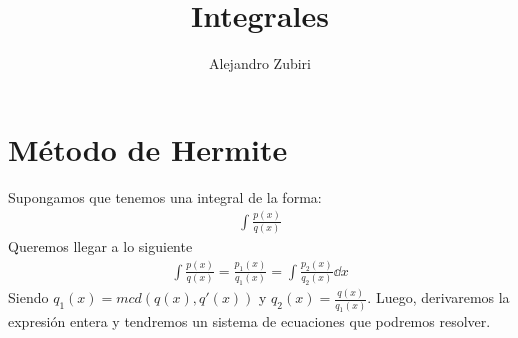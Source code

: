 \documentclass{article}
\author{Alejandro Zubiri}
\title{Integrales}
\begin{document}
\maketitle
\tableofcontents
\pagebreak
\section{Método de Hermite}
Supongamos que tenemos una integral de la forma:
\begin{equation}
	\begin{split}
		\int \frac{p(x)}{q(x)}
	\end{split}
\end{equation}
Queremos llegar a lo siguiente
\begin{equation}
	\begin{split}
		\int \frac{p(x)}{q(x)} = \frac{p_{1}(x)}{q_{1}(x)}=
		\int \frac{p_{2}(x)}{q_{2}(x)} \dd{x}
	\end{split}
\end{equation}
Siendo $q_{1}(x) = mcd(q(x), q'(x))$ y $q_{2}(x)= \frac{q(x)}{q_{1}(x)}$.
Luego, derivaremos la expresión entera y tendremos un sistema de ecuaciones que
podremos resolver.
\end{document}
